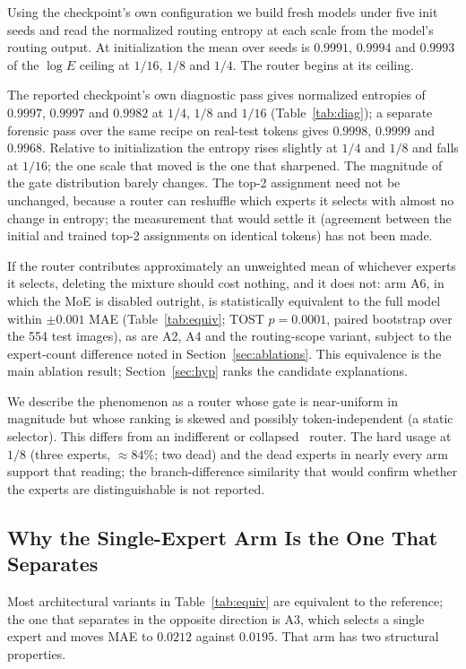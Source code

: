 \documentclass[10pt,a4paper,twocolumn,twoside]{article}
\begin{document}
Using the checkpoint's own configuration we build fresh models under five init seeds and read
the normalized routing entropy at each scale from the model's routing output. At initialization
the mean over seeds is $0.9991$, $0.9994$ and $0.9993$ of the $\log E$ ceiling at $1/16$, $1/8$
and $1/4$. The router begins at its ceiling.

The reported checkpoint's own diagnostic pass gives normalized entropies of $0.9997$, $0.9997$
and $0.9982$ at $1/4$, $1/8$ and $1/16$ (Table~\ref{tab:diag}); a separate forensic pass over
the same recipe on real-test tokens gives $0.9998$, $0.9999$ and $0.9968$. Relative to
initialization the entropy rises slightly at $1/4$ and $1/8$ and falls at $1/16$; the one scale
that moved is the one that sharpened. The magnitude of the gate
distribution barely changes. The top-2 assignment need not be unchanged,
because a router can reshuffle which experts it selects with almost no change in entropy; the
measurement that would settle it (agreement between the initial and trained top-2 assignments
on identical tokens) has not been made.

If the router contributes approximately an unweighted mean of whichever experts it selects,
deleting the mixture should cost nothing, and it does not: arm A6, in which the MoE is disabled
outright, is statistically equivalent to the full model within $\pm 0.001$ MAE
(Table~\ref{tab:equiv}; TOST $p = 0.0001$, paired bootstrap over the 554 test images), as are
A2, A4 and the routing-scope variant, subject to the expert-count difference noted in
Section~\ref{sec:ablations}. This equivalence is the main ablation result;
Section~\ref{sec:hyp} ranks the candidate explanations.


We describe the phenomenon as a router whose gate is near-uniform in magnitude but whose
ranking is skewed and possibly token-independent (a static selector). This differs from
an indifferent or collapsed~\cite{chi2022repcollapse,dai2024deepseekmoe} router. The hard usage at $1/8$ (three experts, $\approx84\%$; two dead)
and the dead experts in nearly every arm support that reading; the branch-difference similarity
that would confirm whether the experts are distinguishable is not reported.

\subsection{Why the Single-Expert Arm Is the One That Separates}
\label{sec:k}
Most architectural variants in Table~\ref{tab:equiv} are equivalent to the reference; the one
that separates in the opposite direction is A3, which selects a single expert and moves MAE to
$0.0212$ against $0.0195$. That arm has two structural properties.
\end{document}
